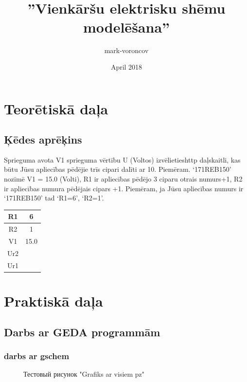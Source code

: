 \documentclass{report}
\title{”Vienkāršu elektrisku shēmu modelēšana”}
\author{mark-voroncov }
\date{April 2018}
\begin{document}
\maketitle

\chapter{Teorētiskā daļa}
\section{Ķēdes aprēķins}
Sprieguma avota V1 sprieguma vērtību U (Voltos) izvēlietieshttp daļskaitli, kas būtu Jūsu apliecības pēdējie trīs cipari dalīti ar 10. Piemēram. ‘171REB150’ nozīmē V1 = 15.0 (Volti), R1 ir apliecības pēdējo 3 ciparu otrais numurs+1, R2 ir apliecības numura pēdējais cipars +1. Piemēram, ja Jūsu apliecības numurs ir ‘171REB150’ tad ‘R1=6’, ‘R2=1’.  


\begin{tabular}{|c|c|}
\hline
     R1 & 6 \\ \hline
     R2 & 1 \\ \hline 
     V1 & 15.0 \\ \hline
     Ur2 &  \\ \hline
     Ur1 &  \\
\hline
\end{tabular}

\chapter{Praktiskā daļa}
\section{Darbs ar GEDA programmām}
\subsection{darbs ar gschem}

\begin{figure}[h]
\caption{Тестовый рисунок "Grafiks ar visiem pz"}
\label{fig:image}
\end{figure}
\end{document}
